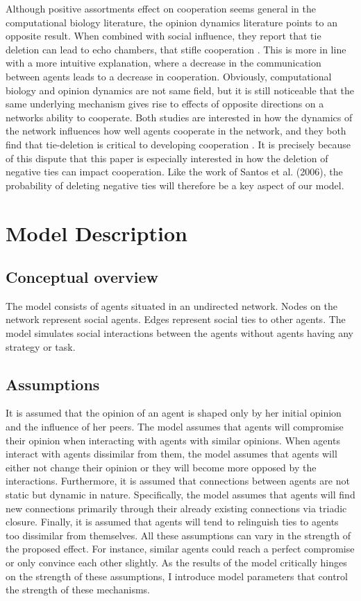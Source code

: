 \documentclass{article}
\begin{document}
Although positive assortments effect on cooperation seems general in the computational biology literature, the opinion dynamics literature points to an opposite result. When combined with social influence, they report that tie deletion can lead to echo chambers, that stifle cooperation \cite{sasahara_social_2021}. This is more in line with a more intuitive explanation, where a decrease in the communication between agents leads to a decrease in cooperation. Obviously, computational biology and opinion dynamics are not same field, but it is still noticeable that the same underlying mechanism gives rise to effects of opposite directions on a networks ability to cooperate. Both studies are interested in how the dynamics of the network influences how well agents cooperate in the network, and they both find that tie-deletion is critical to developing cooperation \cite{santos_cooperation_2006,sasahara_social_2021}. It is precisely because of this dispute that this paper is especially interested in how the deletion of negative ties can impact cooperation. Like the work of Santos et al. (2006), the probability of deleting negative ties will therefore be a key aspect of our model.  


\section{Model Description}
\subsection{Conceptual overview}
The model consists of agents situated in an undirected network. Nodes on the network represent social agents. Edges represent social ties to other agents. 
The model simulates social interactions between the agents without agents having any strategy or task. 

\subsection{Assumptions}
It is assumed that the opinion of an agent is shaped only by her initial opinion and the influence of her peers. 
The model assumes that agents will compromise their opinion when interacting with agents with similar opinions. 
When agents interact with agents dissimilar from them, the model assumes that agents will either not change their opinion or they will become more opposed by the interactions.
Furthermore, it is assumed that connections between agents are not static but dynamic in nature. 
Specifically, the model assumes that agents will find new connections primarily through their already existing connections via triadic closure. Finally, it is assumed that agents will tend to relinguish ties to agents too dissimilar from themselves.
All these assumptions can vary in the strength of the proposed effect. For instance, similar agents could reach a perfect compromise or only convince each other slightly. 
As the results of the model critically hinges on the strength of these assumptions, I introduce model parameters that control the strength of these mechanisms.
\end{document}
